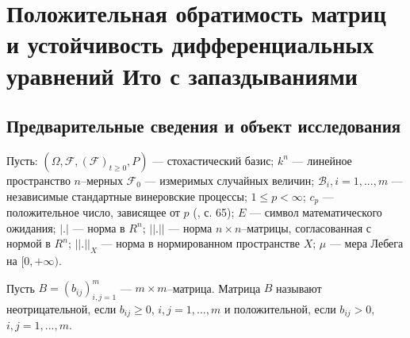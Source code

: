 \chapter{Положительная обратимость матриц и устойчивость
дифференциальных уравнений Ито с запаздываниями}





\section{Предварительные сведения и объект исследования}

Пусть: $(\Omega , {\mathcal F}, ({\mathcal F})_{t\ge0},P)$ ---
стохастический базис; $k^n$ --- линейное пространство $n$--мерных
${\mathcal F}_0$ --- измеримых случайных величин; $\mathcal
B_i,i=1,...,m$ --- независимые стандартные винеровские процессы; $1
\le  p < \infty $; $c_p$ --- положительное число, зависящее от $p$
(\cite{kad8}, с. 65); $E$ --- символ математического ожидания; $|.|$ ---
норма в $R^n$; $||.||$ --- норма $n\times n$--матрицы, согласованная
с нормой в $R^n$; $||.||_X$ --- норма в нормированном пространстве
$X$; $\mu $ --- мера Лебега на $[0,+ \infty)$.

Пусть  $B = (b_{ij})^m_{i,j=1}$ --- $m \times m$--матрица. Матрица
$B$ называют неотрицательной, если $b_{ij} \geq 0$, $i, j = 1,...,m$
и положительной, если $b_{ij} > 0$, $i, j = 1,...,m$.


